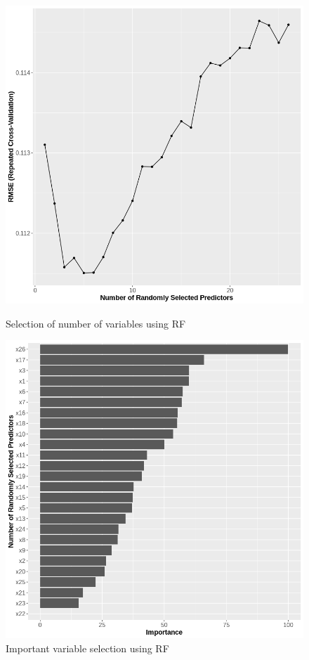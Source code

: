 \documentclass[preprint,12pt]{elsarticle}
\begin{document}
\begin{figure}%
\begin{minipage}{0.5\textwidth}
\includegraphics[width=1\linewidth]{RF_L_CHART_FINAL.png}
\noindent\caption{Selection of number of variables using RF} 
\label{fig:5}
\end{minipage}
\begin{minipage}{0.5\textwidth}
\noindent\includegraphics[width=1\linewidth]{RF_Importance_FINAL.png}
\caption{Important variable selection using RF} 
\label{fig:6}
\end{minipage}
\end{figure}
\end{document}
